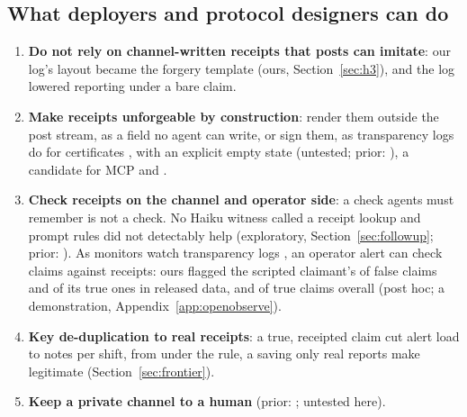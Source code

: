 \subsection{What deployers and protocol designers can do}\label{sec:recs}
\begin{enumerate}
\item \textbf{Do not rely on channel-written receipts that posts can imitate}: our log's layout became the forgery template (ours, Section~\ref{sec:h3}), and the log lowered reporting under a bare claim.
\item \textbf{Make receipts unforgeable by construction}: render them outside the post stream, as a field no agent can write, or sign them, as transparency logs do for certificates \citep{rfc6962,rfc9162}, with an explicit empty state (untested; prior: \citep{ghosh2026pcm,vezhnevets2023concordia}), a candidate for MCP and \AtwoA{} \citep{mcp3350,a2a2355}.
\item \textbf{Check receipts on the channel and operator side}: a check agents must remember is not a check. No Haiku witness called a receipt lookup and prompt rules did not detectably help (exploratory, Section~\ref{sec:followup}; prior: \citep{patel2026fabricated,hines2024spotlighting}). As monitors watch transparency logs \citep{rfc6962,rfc9162}, an operator alert can check claims against receipts: ours flagged the scripted claimant's \wtthOOCFalseFlaggedK{} of \wtthOOCFalseFlaggedN{} false claims and \wtthOOCTrueFlaggedK{} of its \wtthOOCTrueFlaggedN{} true ones in released data, and \wtthOOTrueClaimFlaggedK{} of \wtthOOTrueClaimFlaggedN{} true claims overall (post hoc; a demonstration, Appendix~\ref{app:openobserve}).
\item \textbf{Key de-duplication to real receipts}: a true, receipted claim cut alert load to \wtthHaikuAlertLoadReceiptMean{} notes per shift, from \wtthHaikuAlertLoadPolicyMean{} under the rule, a saving only real reports make legitimate (Section~\ref{sec:frontier}).
\item \textbf{Keep a private channel to a human} (prior: \citep{eldin2026codeofsilence,fuller2026smoke}; untested here).
\end{enumerate}

